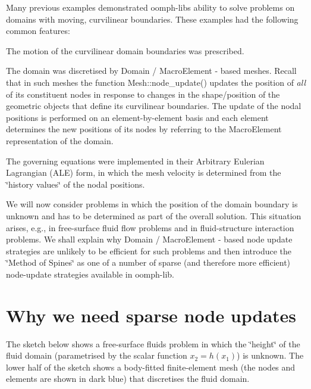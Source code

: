 Many previous examples demonstrated {\ttfamily oomph-\/lib\textquotesingle{}s} ability to solve problems on domains with moving, curvilinear boundaries. These examples had the following common features\+:
\begin{DoxyItemize}
\item The motion of the curvilinear domain boundaries was prescribed.
\item The domain was discretised by {\ttfamily Domain} / {\ttfamily Macro\+Element} -\/ based meshes. Recall that in such meshes the function {\ttfamily Mesh\+::node\+\_\+update()} updates the position of {\itshape all} of its constituent nodes in response to changes in the shape/position of the geometric objects that define its curvilinear boundaries. The update of the nodal positions is performed on an element-\/by-\/element basis and each element determines the new positions of its nodes by referring to the {\ttfamily Macro\+Element} representation of the domain.
\item The governing equations were implemented in their Arbitrary Eulerian Lagrangian (A\+LE) form, in which the mesh velocity is determined from the \char`\"{}history values\char`\"{} of the nodal positions.
\end{DoxyItemize}We will now consider problems in which the position of the domain boundary is unknown and has to be determined as part of the overall solution. This situation arises, e.\+g., in free-\/surface fluid flow problems and in fluid-\/structure interaction problems. We shall explain why {\ttfamily Domain} / {\ttfamily Macro\+Element} -\/ based node update strategies are unlikely to be efficient for such problems and then introduce the \char`\"{}\+Method of Spines\char`\"{} as one of a number of sparse (and therefore more efficient) node-\/update strategies available in {\ttfamily oomph-\/lib}.



\hypertarget{index_why_sparse}{}\section{Why we need sparse node updates}\label{index_why_sparse}
The sketch below shows a free-\/surface fluids problem in which the \char`\"{}height\char`\"{} of the fluid domain (parametrised by the scalar function $ x_2 = h(x_1) $) is unknown. The lower half of the sketch shows a body-\/fitted finite-\/element mesh (the nodes and elements are shown in dark blue) that discretises the fluid domain.

